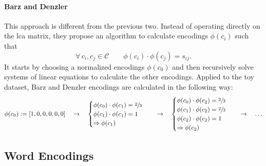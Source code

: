 \paragraph{Barz and Denzler~\cite{HierarchyBasedBarz2018}}\label{par:encoding-bd} This approach is different from the previous two. Instead of operating directly on the \acrshort{lca} matrix, they propose an algorithm to calculate encodings $\phi(c_i)$ such that
\begin{equation}
  \forall \, c_i, c_j \in \mathcal{C} \qquad
  \phi(c_i) \cdot \phi(c_j) = s_{ij}.
  \label{eq:bd-hierarchical-encoding}
\end{equation}
It starts by choosing a normalized encodings $\phi(c_0)$ and then recursively solve systems of linear equations to calculate the other encodings.
Applied to the toy dataset, Barz and Denzler encodings are calculated in the following way:
\begin{equation*}
  \phi{\left(c_0\right)} := \left[1, 0, 0, 0, 0, 0\right]
  \quad \rightarrow \quad
  \begin{cases}
    \phi{\left(c_0\right)} \cdot \phi{\left(c_1\right)} = \sfrac{2}{3} \\
    \phi{\left(c_1\right)} \cdot \phi{\left(c_1\right)} = 1 \\
    \Rightarrow  \phi{\left(c_1\right)}
  \end{cases}
  \quad \rightarrow \quad
  \begin{cases}
    \phi{\left(c_0\right)} \cdot \phi{\left(c_2\right)} = \sfrac{2}{3} \\
    \phi{\left(c_1\right)} \cdot \phi{\left(c_2\right)} = \sfrac{2}{3} \\
    \phi{\left(c_2\right)} \cdot \phi{\left(c_2\right)} = 1 \\
    \Rightarrow \phi{\left(c_2\right)}
  \end{cases}
  \quad \rightarrow \quad \ldots
\end{equation*}

\subsection{Word Encodings}
\label{subsec:word-encoding}

